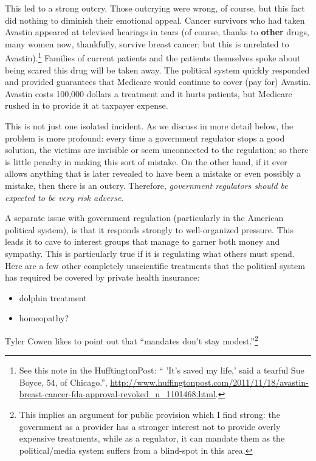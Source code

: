 This led to a strong outcry. Those outcrying were wrong, of course, but this
fact did nothing to diminish their emotional appeal. Cancer survivors who had
taken Avastin appeared at televised hearings in tears (of course, thanks to
\textbf{other} drugs, many women now, thankfully, survive breast cancer; but
this is unrelated to Avastin).\footnote{See this note in the HufftingtonPost:
`` 'It's saved my life,' said a tearful Sue Boyce, 54, of Chicago.'',
\url{http://www.huffingtonpost.com/2011/11/18/avastin-breast-cancer-fda-approval-revoked_n_1101468.html}.}
Families of current patients and the patients themselves spoke about being
scared this drug will be taken away. The political system quickly responded and
provided guarantees that Medicare would continue to cover (pay for) Avastin.
Avastin costs 100,000 dollars a treatment and it hurts patients, but Medicare
rushed in to provide it at taxpayer expense.

This is not just one isolated incident. As we discuss in more detail below, the
problem is more profound: every time a government regulator stops a good
solution, the victims are invisible or seem unconnected to the regulation; so
there is little penalty in making this sort of mistake. On the other hand, if
it ever allows anything that is later revealed to have been a mistake or even
possibly a mistake, then there is an outcry. Therefore, \emph{government
regulators should be expected to be very risk adverse}.

A separate issue with government regulation (particularly in the American
political system), is that it responds strongly to well-organized pressure.
This leads it to cave to interest groups that manage to garner both money and
sympathy. This is particularly true if it is regulating what others must spend.
Here are a few other completely unscientific treatments that the political
system has required be covered by private health insurance:

\begin{itemize}
\item dolphin treatment
\item homeopathy?
\end{itemize}

Tyler Cowen likes to point out that ``mandates don't stay
modest.''\footnote{This implies an argument for public provision which I find
strong: the government as a provider has a stronger interest not to provide
overly expensive treatments, while as a regulator, it can mandate them as the
political/media system suffers from a blind-spot in this area.}

